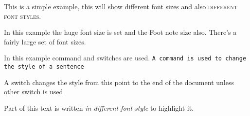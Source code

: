 \documentclass{article}
\begin{document}
This is a simple example, {\tiny this will show different font sizes} and also \textsc{different font styles}. 

\vspace{1cm}

In this example the {\huge huge font size} is set and the {\footnotesize Foot note size also}. There's a fairly large set of font sizes.


\vspace{1cm}

In this example command and switches are used. \texttt{A command is used to change the style of a sentence}

\sffamily
A switch changes the style from this point to the end of the document unless other switch is used
\rmfamily

\vspace{1cm}

Part of this text is written \textsl{in different font style} to highlight it.
\end{document}
